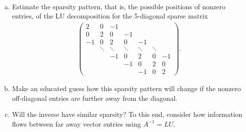 
\begin{Sheet}
  \label{sheet8}

  \begin{Problem}
    \hfill\\\vspace{-6ex}
    \begin{enumerate}[(a)]
    \item Estimate the sparsity pattern, that is, the possible
      positions of nonzero entries, of the LU decomposition for the
      5-diagonal sparse matrix
      \begin{gather*}
        \begin{pmatrix}
          2 & 0 &-1 &   &   & & \\
          0 & 2 & 0 &-1 &   & & \\
          -1 & 0 & 2 & 0 &-1 & & \\
            & \ddots & \ddots & \ddots & \ddots & \ddots  & \\
            & &-1 & 0 & 2 & 0 &-1 \\
            & &   &-1 & 0 & 2 & 0 \\
            & &   &   &-1 & 0 & 2
        \end{pmatrix}.
      \end{gather*}
    \item Make an educated guess how this sparsity pattern will change
      if the nonzero off-diagonal entries are further away from the
      diagonal.
    \item Will the inverse have similar sparsity? To this end,
      consider how information flows between far away vector entries
      using $A^{-1} = LU$.
    \end{enumerate}
  \end{Problem}


\end{Sheet}
